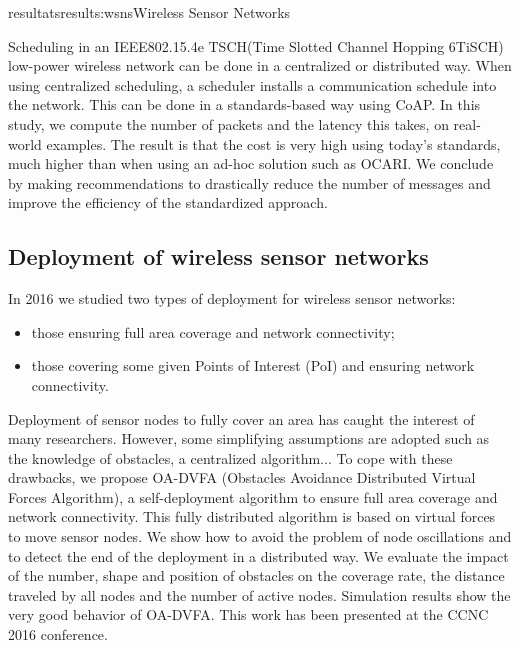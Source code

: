 \documentclass{ra2016}
\begin{document}
\begin{module}{resultats}{results:wsns}{Wireless Sensor Networks}
\begin{participants}
\end{participants}

Scheduling in an IEEE802.15.4e TSCH(Time Slotted Channel Hopping 6TiSCH) low-power wireless network can be done in a centralized or distributed way. When using centralized scheduling, a scheduler installs a communication schedule into the network. This can be done in a standards-based way using CoAP. In this study, we compute the number of packets  and the latency this takes, on real-world examples. The result is that the cost is very high using today's standards, much higher than when using an ad-hoc solution such as OCARI. We conclude by making recommendations to drastically reduce the number of messages and improve the efficiency of the standardized approach.

\subsection{Deployment of wireless sensor networks}


In 2016 we studied two types of deployment for wireless sensor networks:
\begin{itemize}
\item those ensuring full area coverage and network connectivity;
\item those covering some given Points of Interest (PoI) and ensuring network connectivity.\\
\end{itemize}

Deployment of sensor nodes to fully cover an area has caught the interest of many researchers. However, some simplifying assumptions are adopted such as the knowledge of obstacles, a centralized algorithm... To cope with these drawbacks, we propose OA-DVFA (Obstacles Avoidance Distributed Virtual Forces Algorithm), a self-deployment algorithm to ensure full area coverage and network connectivity.  This fully distributed algorithm is based on virtual forces to move sensor nodes. We show how to avoid the problem of node oscillations and to detect the end of the deployment in a distributed way. 
We evaluate the impact of the number, shape and position of obstacles on the coverage rate, the distance traveled by all nodes and the number of active nodes. Simulation results show the very good behavior of OA-DVFA. This work has been presented at the CCNC 2016 conference.\\


\end{module}
\end{document}
